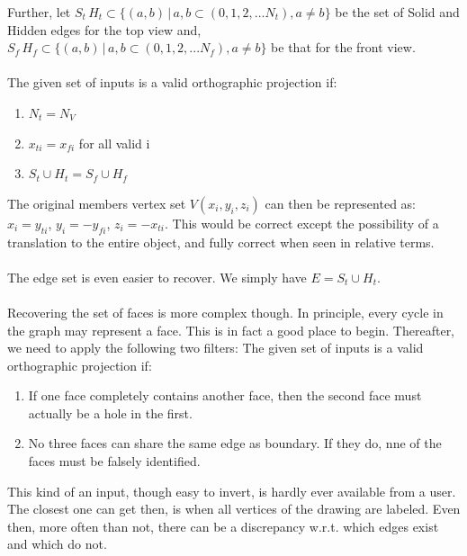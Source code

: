 \documentclass[
11pt, %
english, %
singlespacing, %
headsepline, %
]{MastersDoctoralThesis} %
\begin{document}
Further, let $S_t\, H_t \subset \{ (a,b) \, | \, a,b \subset (0,1,2,... N_t), a \neq b \} $ be the set of Solid and Hidden edges for the top view and, $S_f\, H_f \subset \{ (a,b) \, | \, a,b \subset (0,1,2,... N_f), a \neq b \} $ be that for the front view. \\ \\
The given set of inputs is a valid orthographic projection if:
\begin{enumerate}
\item $N_t = N_V$ 
\item $x_{ti} = x_{fi}$ for all valid i
\item $S_t \cup H_t = S_f \cup H_f$
\end{enumerate}
The original members vertex set $V(x_i, y_i, z_i)$ can then be represented as: $x_i = y_{ti}$, $y_i = -y_{fi}$, $z_i = -x_{ti}$. This would be correct except the possibility of a translation to the entire object, and fully correct when seen in relative terms.\\ \\
The edge set is even easier to recover. We simply have $E = S_t \cup H_t$. \\ \\
Recovering the set of faces is more complex though. In principle, every cycle in the graph may represent a face. This is in fact a good place to begin. Thereafter, we need to apply the following two filters:
The given set of inputs is a valid orthographic projection if:
\begin{enumerate}
\item If one face completely contains another face, then the second face must actually be a hole in the first.
\item No three faces can share the same edge as boundary. If they do, nne of the faces must be falsely identified. 
\end{enumerate}
This kind of an input, though easy to invert, is hardly ever available from a user. The closest one can get then, is when all vertices of the drawing are labeled. Even then, more often than not, there can be a discrepancy w.r.t. which edges exist and which do not.
\end{document}

